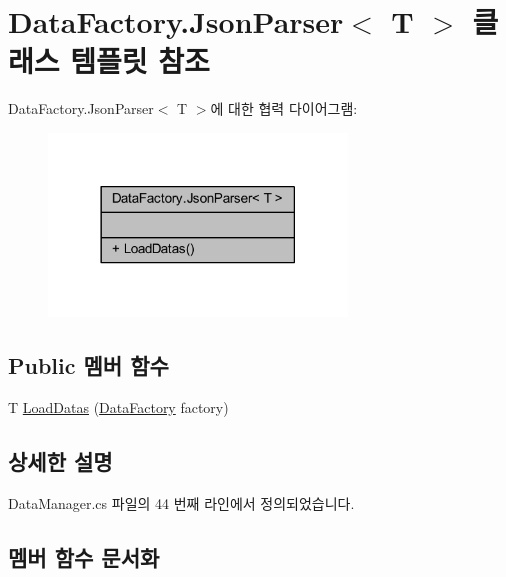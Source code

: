 \hypertarget{class_data_factory_1_1_json_parser}{}\section{Data\+Factory.\+Json\+Parser$<$ T $>$ 클래스 템플릿 참조}
\label{class_data_factory_1_1_json_parser}


Data\+Factory.\+Json\+Parser$<$ T $>$에 대한 협력 다이어그램\+:
\nopagebreak
\begin{figure}[H]
\begin{center}
\leavevmode
\includegraphics[width=225pt]{class_data_factory_1_1_json_parser__coll__graph}
\end{center}
\end{figure}
\subsection*{Public 멤버 함수}
\begin{DoxyCompactItemize}
\item 
T \hyperlink{class_data_factory_1_1_json_parser_aef625d66ef24c990b9ddde3a3b3af73d}{Load\+Datas} (\hyperlink{class_data_factory}{Data\+Factory} factory)
\end{DoxyCompactItemize}


\subsection{상세한 설명}


Data\+Manager.\+cs 파일의 44 번째 라인에서 정의되었습니다.



\subsection{멤버 함수 문서화}
